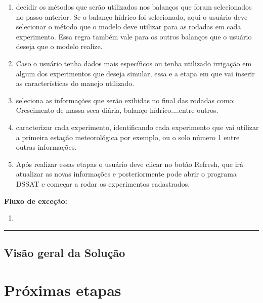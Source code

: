 \documentclass[12pt]{article}
\begin{document}
\begin{enumerate}
		\item decidir os métodos que serão utilizados nos balanços que foram selecionados no passo anterior. Se o balanço hídrico foi selecionado, aqui o usuário deve selecionar o método que o modelo deve utilizar para as rodadas em cada experimento. Essa regra também vale para os outros balanços que o usuário deseja que o modelo realize.
		\item Caso o usuário tenha dados mais específicos ou tenha utilizado irrigação em algum dos experimentos que deseja simular, essa e a etapa em que vai inserir as características do manejo utilizado. 
		\item seleciona as informações que serão exibidas no final das rodadas como: Crescimento de massa seca diária, balanço hídrico....entre outros.
		\item caracterizar cada experimento, identificando cada experimento que vai utilizar a primeira estação meteorológica por exemplo, ou o solo número 1 entre outras informações.
		\item Após realizar essas etapas o usuário deve clicar no botão Refresh, que irá atualizar as novas informações e posteriormente pode abrir o programa DSSAT e começar a rodar os experimentos cadastrados.

	\end{enumerate}
	
	{\bf Fluxo de exceção:}
	
	\begin{enumerate}
		\item  
	\end{enumerate}
	
	\bigskip \hrule \bigskip
	

	\subsection {Visão geral da Solução}
	
	\section{Próximas etapas}
	
	
	 

	
\end{document}

